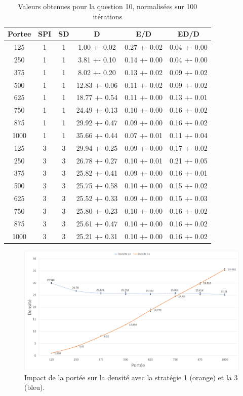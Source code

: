 \documentclass[a4paper]{article}
\begin{document}
\begin{minipage}{0.55\textwidth}
  \begin{table}[H]
    \centering
    \begin{tabular}{|c|c|c|c|c|c|}
      \hline
Portee & SPI & SD & D & E/D & ED/D \\
      \hline
125 & 1 & 1 &  1.00 +- 0.02& 0.27 +- 0.02 & 0.04 +- 0.00 \\
250 & 1 & 1 &  3.81 +- 0.10& 0.14 +- 0.00 & 0.04 +- 0.00 \\
375 & 1 & 1 &  8.02 +- 0.20& 0.13 +- 0.02 & 0.09 +- 0.02 \\
500 & 1 & 1 & 12.83 +- 0.06& 0.11 +- 0.02 & 0.09 +- 0.02 \\
625 & 1 & 1 & 18.77 +- 0.54& 0.11 +- 0.00 & 0.13 +- 0.01 \\
750 & 1 & 1 & 24.49 +- 0.13& 0.10 +- 0.00 & 0.16 +- 0.02 \\
875 & 1 & 1 & 29.92 +- 0.47& 0.09 +- 0.00 & 0.16 +- 0.02 \\
1000& 1 & 1 & 35.66 +- 0.44& 0.07 +- 0.01 & 0.11 +- 0.04 \\
\hline
125 & 3 & 3 & 29.94 +- 0.25 & 0.09 +- 0.00 & 0.17 +- 0.02 \\
250 & 3 & 3 & 26.78 +- 0.27 & 0.10 +- 0.01 & 0.21 +- 0.05 \\
375 & 3 & 3 & 25.82 +- 0.41 & 0.09 +- 0.00 & 0.16 +- 0.01 \\
500 & 3 & 3 & 25.75 +- 0.58 & 0.10 +- 0.00 & 0.15 +- 0.02 \\
625 & 3 & 3 & 25.52 +- 0.33 & 0.09 +- 0.00 & 0.15 +- 0.03 \\
750 & 3 & 3 & 25.80 +- 0.23 & 0.10 +- 0.00 & 0.16 +- 0.02 \\
875 & 3 & 3 & 25.61 +- 0.47 & 0.10 +- 0.00 & 0.16 +- 0.02 \\
1000& 3 & 3 & 25.21 +- 0.31 & 0.10 +- 0.00 & 0.16 +- 0.02 \\
\hline
    \end{tabular}
\caption{Valeurs obtenues pour la question 10, normalisées sur 100 itérations}
\end{table}
\end{minipage}
\vfill

\begin{figure}[H]
  \centering
  \includegraphics[width=\textwidth]{images/q10-11-s1and2.png}
  \caption{Impact de la portée sur la densité avec la stratégie 1 (orange) et la 3 (bleu).}
  \label{fig:S1-S3-portee}
\end{figure}
\end{document}
